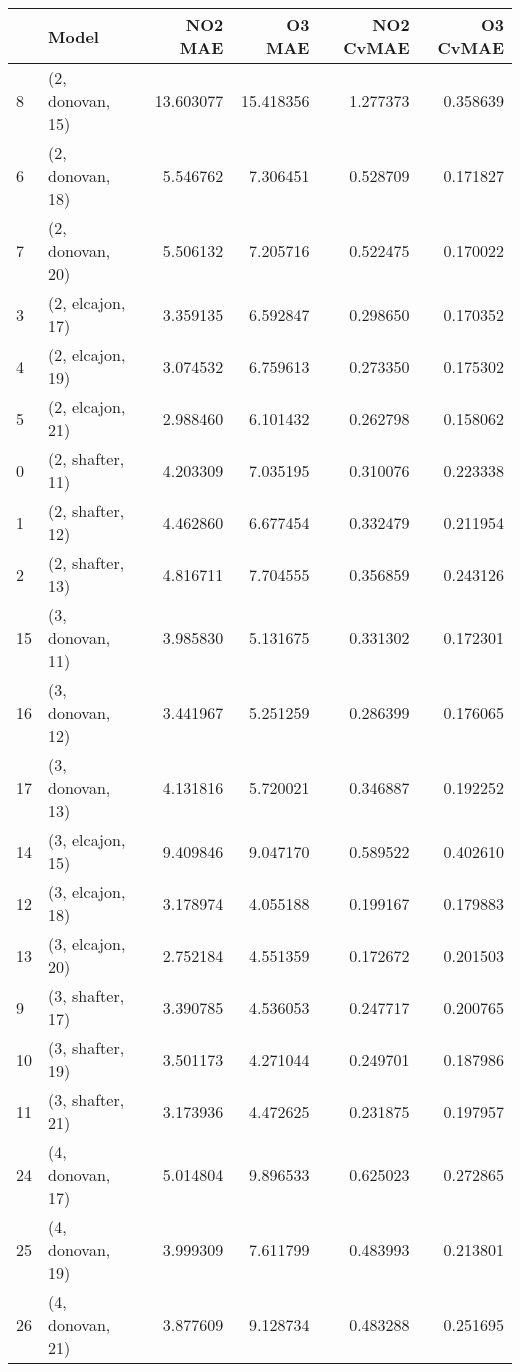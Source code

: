 \begin{tabular}{llrrrr}
\toprule
{} &             Model &    NO2 MAE &     O3 MAE &  NO2 CvMAE &  O3 CvMAE \\
\midrule
8  &  (2, donovan, 15) &  13.603077 &  15.418356 &   1.277373 &  0.358639 \\
6  &  (2, donovan, 18) &   5.546762 &   7.306451 &   0.528709 &  0.171827 \\
7  &  (2, donovan, 20) &   5.506132 &   7.205716 &   0.522475 &  0.170022 \\
3  &  (2, elcajon, 17) &   3.359135 &   6.592847 &   0.298650 &  0.170352 \\
4  &  (2, elcajon, 19) &   3.074532 &   6.759613 &   0.273350 &  0.175302 \\
5  &  (2, elcajon, 21) &   2.988460 &   6.101432 &   0.262798 &  0.158062 \\
0  &  (2, shafter, 11) &   4.203309 &   7.035195 &   0.310076 &  0.223338 \\
1  &  (2, shafter, 12) &   4.462860 &   6.677454 &   0.332479 &  0.211954 \\
2  &  (2, shafter, 13) &   4.816711 &   7.704555 &   0.356859 &  0.243126 \\
15 &  (3, donovan, 11) &   3.985830 &   5.131675 &   0.331302 &  0.172301 \\
16 &  (3, donovan, 12) &   3.441967 &   5.251259 &   0.286399 &  0.176065 \\
17 &  (3, donovan, 13) &   4.131816 &   5.720021 &   0.346887 &  0.192252 \\
14 &  (3, elcajon, 15) &   9.409846 &   9.047170 &   0.589522 &  0.402610 \\
12 &  (3, elcajon, 18) &   3.178974 &   4.055188 &   0.199167 &  0.179883 \\
13 &  (3, elcajon, 20) &   2.752184 &   4.551359 &   0.172672 &  0.201503 \\
9  &  (3, shafter, 17) &   3.390785 &   4.536053 &   0.247717 &  0.200765 \\
10 &  (3, shafter, 19) &   3.501173 &   4.271044 &   0.249701 &  0.187986 \\
11 &  (3, shafter, 21) &   3.173936 &   4.472625 &   0.231875 &  0.197957 \\
24 &  (4, donovan, 17) &   5.014804 &   9.896533 &   0.625023 &  0.272865 \\
25 &  (4, donovan, 19) &   3.999309 &   7.611799 &   0.483993 &  0.213801 \\
26 &  (4, donovan, 21) &   3.877609 &   9.128734 &   0.483288 &  0.251695 \\

\end{tabular}
